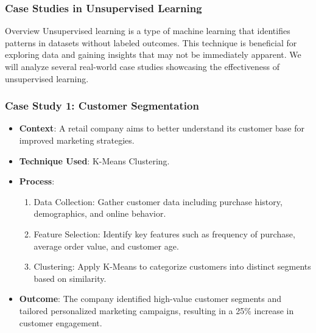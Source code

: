 \documentclass[aspectratio=169]{beamer}
\begin{document}
\begin{frame}[fragile]
    \frametitle{Case Studies in Unsupervised Learning}
    \begin{block}{Overview}
        Unsupervised learning is a type of machine learning that identifies patterns in datasets without labeled outcomes. 
        This technique is beneficial for exploring data and gaining insights that may not be immediately apparent. 
        We will analyze several real-world case studies showcasing the effectiveness of unsupervised learning.
    \end{block}
\end{frame}

\begin{frame}[fragile]
    \frametitle{Case Study 1: Customer Segmentation}
    \begin{itemize}
        \item \textbf{Context}: A retail company aims to better understand its customer base for improved marketing strategies.
        \item \textbf{Technique Used}: K-Means Clustering.
        \item \textbf{Process}:
        \begin{enumerate}
            \item Data Collection: Gather customer data including purchase history, demographics, and online behavior.
            \item Feature Selection: Identify key features such as frequency of purchase, average order value, and customer age.
            \item Clustering: Apply K-Means to categorize customers into distinct segments based on similarity.
        \end{enumerate}
        \item \textbf{Outcome}: The company identified high-value customer segments and tailored personalized marketing campaigns, resulting in a 25\% increase in customer engagement.
    \end{itemize}
\end{frame}
\end{document}
